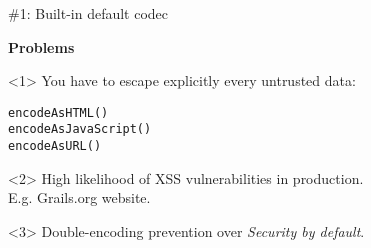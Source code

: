 \begin{frame}

    \vspace{.5cm}

    \begin{center}
      \Huge\color{red} \#1: Built-in default codec \\
    \end{center}

    \vspace{1cm}

    \Large
    \textbf{Problems} \\[1em]

    \begin{onlyenv}<1>
      You have to escape explicitly every untrusted data:
      \begin{center}
        \begin{minipage}{.9\textwidth}
          \begin{verbatim}
encodeAsHTML()
encodeAsJavaScript()
encodeAsURL()
          \end{verbatim}
        \end{minipage}
      \end{center}
    \end{onlyenv}

    \begin{onlyenv}<2>
      High likelihood of XSS vulnerabilities in production.\\[1em]
      E.g. Grails.org website.
    \end{onlyenv}

    \begin{onlyenv}<3>
      Double-encoding prevention over \emph{Security by default}.
    \end{onlyenv}

    \vfill

\end{frame}

